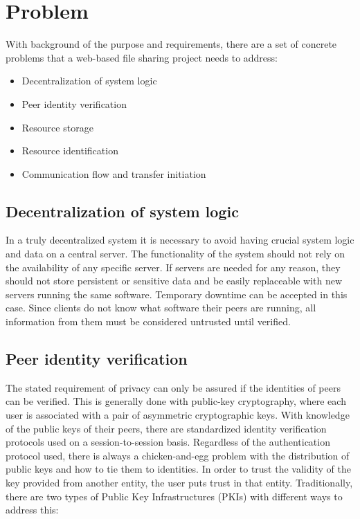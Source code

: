 \section{Problem}
\label{sec:problem}

With background of the purpose and requirements, there are a set of concrete problems that a web-based file sharing project needs to address:

\begin{itemize}
\item Decentralization of system logic
\item Peer identity verification
\item Resource storage
\item Resource identification
\item Communication flow and transfer initiation
\end{itemize}

\subsection{Decentralization of system logic}
In a truly decentralized system it is necessary to avoid having crucial system logic and data on a central server. The functionality of the system should not rely on the availability of any specific server. If servers are needed for any reason, they should not store persistent or sensitive data and be easily replaceable with new servers running the same software. Temporary downtime can be accepted in this case. Since clients do not know what software their peers are running, all information from them must be considered untrusted until verified.

\subsection{Peer identity verification}
The stated requirement of privacy can only be assured if the identities of peers can be verified. This is generally done with public-key cryptography, where each user is associated with a pair of asymmetric cryptographic keys. With knowledge of the public keys of their peers, there are standardized identity verification protocols used on a session-to-session basis. Regardless of the authentication protocol used, there is always a chicken-and-egg problem with the distribution of public keys and how to tie them to identities. In order to trust the validity of the key provided from another entity, the user puts trust in that entity. Traditionally, there are two types of Public Key Infrastructures (PKIs) with different ways to address this:

